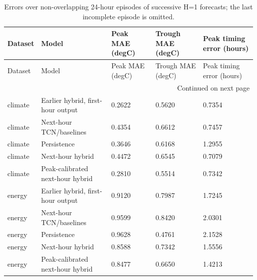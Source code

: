 {\footnotesize
\setlength{\tabcolsep}{3pt}
\renewcommand{\arraystretch}{1.17}
\begin{longtable}{@{}p{}p{}p{}p{}p{}@{}}
\caption{Errors over non-overlapping 24-hour episodes of successive H=1 forecasts; the last incomplete episode is omitted.}\label{tab:peak_table}\\
\toprule
Dataset & Model & Peak MAE (degC) & Trough MAE (degC) & Peak timing error (hours) \\
\midrule\endfirsthead
Dataset & Model & Peak MAE (degC) & Trough MAE (degC) & Peak timing error (hours) \\
\midrule\endhead
\midrule\multicolumn{5}{r}{Continued on next page}\\\endfoot
\bottomrule\endlastfoot
climate & Earlier hybrid, first-hour output & 0.2622 & 0.5620 & 0.7354 \\
climate & Next-hour TCN/baselines & 0.4354 & 0.6612 & 0.7457 \\
climate & Persistence & 0.3646 & 0.6168 & 1.2955 \\
climate & Next-hour hybrid & 0.4472 & 0.6545 & 0.7079 \\
climate & Peak-calibrated next-hour hybrid & 0.2810 & 0.5514 & 0.7342 \\
energy & Earlier hybrid, first-hour output & 0.9120 & 0.7987 & 1.7245 \\
energy & Next-hour TCN/baselines & 0.9599 & 0.8420 & 2.0301 \\
energy & Persistence & 0.9628 & 0.4761 & 2.1528 \\
energy & Next-hour hybrid & 0.8588 & 0.7342 & 1.5556 \\
energy & Peak-calibrated next-hour hybrid & 0.8477 & 0.6650 & 1.4213 \\
\end{longtable}
}
